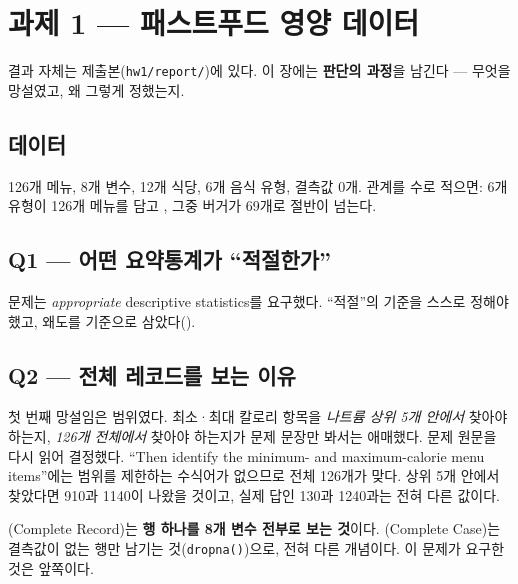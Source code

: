 \chapter{과제 1 --- 패스트푸드 영양 데이터}
\label{ch:hw1}

\begin{aside}
결과 자체는 제출본(\texttt{hw1/report/})에 있다. 이 장에는 \textbf{판단의 과정}을
남긴다 --- 무엇을 망설였고, 왜 그렇게 정했는지.
\end{aside}

\section{데이터}
\label{sec:hw1-data}

126개 메뉴, 8개 변수, 12개 식당, 6개 음식 유형, 결측값 0개.
관계를 수로 적으면: 6개 유형이 126개 메뉴를 담고 \contains, 그중 버거가 69개로
절반이 넘는다.

\section{Q1 --- 어떤 요약통계가 ``적절한가''}
\label{sec:hw1-q1}

문제는 \textit{appropriate} descriptive statistics를 요구했다. ``적절''의 기준을
스스로 정해야 했고, 왜도를 기준으로 삼았다().

\section{Q2 --- 전체 레코드를 보는 이유}
\label{sec:hw1-q2}

첫 번째 망설임은 범위였다. 최소·최대 칼로리 항목을 \emph{나트륨 상위 5개 안에서}
찾아야 하는지, \emph{126개 전체에서} 찾아야 하는지가 문제 문장만 봐서는 애매했다.
문제 원문을 다시 읽어 결정했다. ``Then identify the minimum- and maximum-calorie menu
items''에는 범위를 제한하는 수식어가 없으므로 전체 126개가 맞다. 상위 5개 안에서
찾았다면 910과 1140이 나왔을 것이고, 실제 답인 130과 1240과는 전혀 다른 값이다.

\begin{pitfall}
(Complete Record)는 \textbf{행 하나를 8개 변수 전부로 보는 것}이다.
(Complete Case)는 결측값이 없는 행만 남기는 것(\texttt{dropna()})으로,
전혀 다른 개념이다. 이 문제가 요구한 것은 앞쪽이다.
\end{pitfall}

